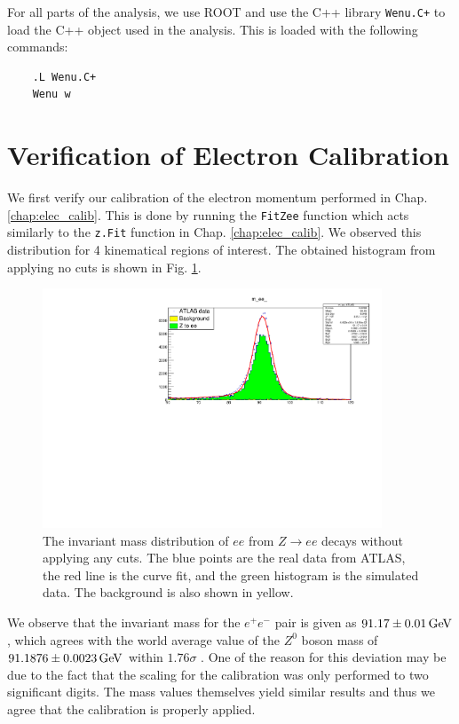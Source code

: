 \documentclass[a4paper]{report}
\numberwithin{equation}{section}
\begin{document}
For all parts of the analysis, we use ROOT and use the C++ library \texttt{Wenu.C+} to load the C++ object used in the analysis. 
This is loaded with the following commands:
\begin{verbatim}
    .L Wenu.C+ 
    Wenu w
\end{verbatim} 


\section{Verification of Electron Calibration}

We first verify our calibration of the electron momentum performed in Chap. \ref{chap:elec_calib}. This is done by 
running the \texttt{FitZee} function which acts similarly to the \texttt{z.Fit} function in Chap. \ref{chap:elec_calib}. We observed 
this distribution for 4 kinematical regions of interest. The obtained histogram from applying no cuts is shown in Fig. \ref{fig:zee_calib}. 

\begin{figure}[htpb]
    \centering
    \includegraphics[width=0.9\textwidth]{zeefit.pdf}
    \caption{The invariant mass distribution of $ee$ from $Z \rightarrow ee$ decays without applying any cuts. The blue points are the 
    real data from ATLAS, the red line is the curve fit, and the green histogram is the simulated data. The background 
    is also shown in yellow.}
    \label{fig:zee_calib}
\end{figure}

We observe that the invariant mass for the $e^+ e^-$ pair is given as $\SI{91.17 \pm 0.01}{\giga\electronvolt}$, which agrees with the 
world average value of the $Z^0$ boson mass of $\SI{91.1876 \pm 0.0023}{\giga\electronvolt}$ within $1.76\sigma$ \cite{ParticleDataGroup:2020ssz}.
One of the reason for this deviation may be due to the fact that the scaling for the calibration was only performed to two significant digits. The mass values themselves yield similar results and thus we agree that the calibration is properly applied. \par 
\end{document}
